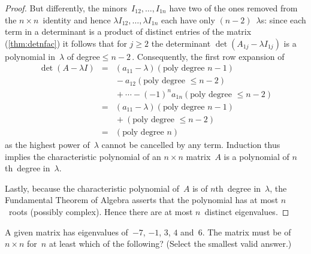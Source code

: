 \begin{proof}
But differently, the minors~\(I_{12},\ldots,I_{1n}\) have two of the ones removed from the \(n\times n\)~identity and hence \(\lambda I_{12},\ldots,\lambda I_{1n}\) each have only \((n-2)\)~\(\lambda\)s: since each term in a determinant is a product of distinct entries of the matrix (\autoref{thm:detnfac}) it follows that for \(j\geq2\) the determinant \(\det(A_{1j}-\lambda I_{1j})\) is a polynomial in~\(\lambda\) of degree\({}\leq n-2\)\,.
Consequently, the first row expansion of 
\begin{eqnarray*}
\det(A-\lambda I)
&=&(a_{11}-\lambda)(\text{poly degree }n-1)
\\&&{}
-a_{12}(\text{poly degree }\leq n-2)
\\&&{}
+\cdots-(-1)^{n}a_{1n}(\text{poly degree }\leq n-2)
\\&=&(a_{11}-\lambda)(\text{poly degree }n-1)
\\&&{}
+(\text{poly degree }\leq n-2)
\\&=&(\text{poly degree }n)
\end{eqnarray*}
as the highest power of~\(\lambda\) cannot be cancelled by any term.
Induction thus implies the characteristic polynomial of an \(n\times n\) matrix~\(A\) is a polynomial of \(n\)th~degree in~\(\lambda\).

Lastly, because the characteristic polynomial of~\(A\) is of \(n\)th~degree in~\(\lambda\), the Fundamental Theorem of Algebra asserts that the polynomial has at most \(n\)~roots (possibly complex).  
Hence there are at most \(n\)~distinct eigenvalues.
\end{proof}



\begin{activity}
A given matrix has eigenvalues of~\(-7\), \(-1\), \(3\), \(4\)  and~\(6\).
The matrix must be of  \(n\times n\) for~\(n\) at least which of the following? (Select the smallest valid answer.)
\end{activity}




